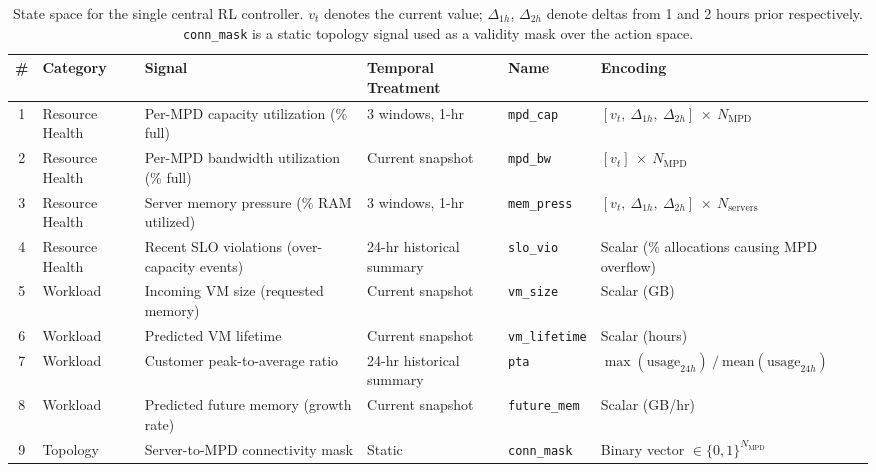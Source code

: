 \documentclass[11pt]{article}
\begin{document}
\begin{landscape}
\begin{table}[H]
\centering
\renewcommand{\arraystretch}{1.6}
\setlength{\tabcolsep}{6pt}
\begin{tabularx}{\linewidth}{|c|l|X|l|l|X|}
\hline
\textbf{\#} & \textbf{Category} & \textbf{Signal} & \textbf{Temporal Treatment} & \textbf{Name} & \textbf{Encoding} \\
\hline
1 & Resource Health & Per-MPD capacity utilization (\% full)
  & 3 windows, 1-hr & \texttt{mpd\_cap}
  & $[v_t,\ \Delta_{1h},\ \Delta_{2h}]\ \times\ N_\text{MPD}$ \\
\hline
2 & Resource Health & Per-MPD bandwidth utilization (\% full)
  & Current snapshot & \texttt{mpd\_bw}
  & $[v_t]\ \times\ N_\text{MPD}$ \\
\hline
3 & Resource Health & Server memory pressure (\% RAM utilized)
  & 3 windows, 1-hr & \texttt{mem\_press}
  & $[v_t,\ \Delta_{1h},\ \Delta_{2h}]\ \times\ N_\text{servers}$ \\
\hline
4 & Resource Health & Recent SLO violations (over-capacity events)
  & 24-hr historical summary & \texttt{slo\_vio}
  & Scalar (\% allocations causing MPD overflow) \\
\hline
5 & Workload & Incoming VM size (requested memory)
  & Current snapshot & \texttt{vm\_size}
  & Scalar (GB) \\
\hline
6 & Workload & Predicted VM lifetime
  & Current snapshot & \texttt{vm\_lifetime}
  & Scalar (hours) \\
\hline
7 & Workload & Customer peak-to-average ratio
  & 24-hr historical summary & \texttt{pta}
  & $\max(\text{usage}_{24h})\ /\ \text{mean}(\text{usage}_{24h})$ \\
\hline
8 & Workload & Predicted future memory (growth rate)
  & Current snapshot & \texttt{future\_mem}
  & Scalar (GB/hr) \\
\hline
9 & Topology & Server-to-MPD connectivity mask
  & Static & \texttt{conn\_mask}
  & Binary vector $\in \{0,1\}^{N_\text{MPD}}$ \\
\hline
\end{tabularx}
\caption{State space for the single central RL controller. $v_t$ denotes
the current value; $\Delta_{1h}$, $\Delta_{2h}$ denote deltas from 1 and
2 hours prior respectively. \texttt{conn\_mask} is a static topology signal
used as a validity mask over the action space.}
\label{tab:states}
\end{table}
\end{landscape}
\end{document}

